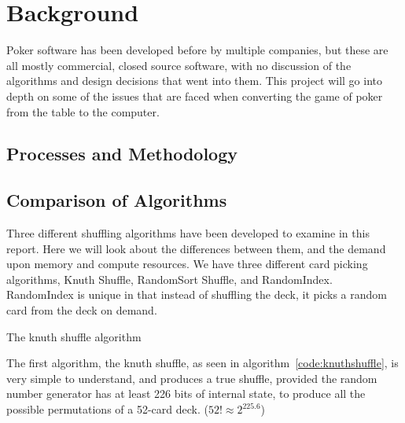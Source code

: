 \section{Background}
Poker software has been developed before by multiple companies, but these
are all mostly commercial, closed source software, with no discussion of the
algorithms and design decisions that went into them. This project will go
into depth on some of the issues that are faced when converting the game of
poker from the table to the computer.

\subsection{Processes and Methodology}

\subsection{Comparison of Algorithms}

Three different shuffling algorithms have been developed to examine in this
report. Here we will look about the differences between them, and the demand
upon memory and compute resources. We have three different card picking
algorithms, Knuth Shuffle, RandomSort Shuffle, and RandomIndex. RandomIndex
is unique in that instead of shuffling the deck, it picks a random card
from the deck on demand.

\vspace{0.3cm}

\begin{algorithm}[H]
    \BlankLine{}
     
\caption{The knuth shuffle algorithm}
\label{code:knuthshuffle}
\end{algorithm}

\vspace{0.3cm}

The first algorithm, the knuth shuffle, as seen in algorithm~\ref{code:knuthshuffle},
is very simple to understand, and produces a true shuffle, provided the
random number generator has at least 226 bits of internal state, to produce all
the possible permutations of a 52-card deck. ($52! \approx 2^{225.6}$) \parencite{arkin1999}

